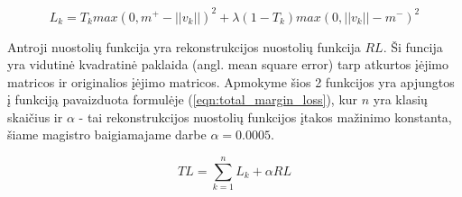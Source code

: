 \begin{equation}
\label{eqn:margin_loss}
	L_{k} = T_k max(0, m^+ - ||v_k||)^2 + \lambda (1 - T_k) max(0, ||v_k|| - m^-)^2
\end{equation}

Antroji nuostolių funkcija yra rekonstrukcijos nuostolių funkcija $RL$. Ši funcija yra vidutinė kvadratinė paklaida (angl. mean square error) tarp atkurtos įėjimo matricos ir originalios įėjimo matricos. Apmokyme šios 2 funkcijos yra apjungtos į funkciją pavaizduota formulėje (\ref{eqn:total_margin_loss}), kur $n$ yra klasių skaičius ir $\alpha$ - tai rekonstrukcijos nuostolių funkcijos įtakos mažinimo konstanta, šiame magistro baigiamajame darbe $\alpha = 0.0005$.

\begin{equation}
\label{eqn:total_margin_loss}
	TL = \sum_{k = 1}^{n} L_{k} + \alpha RL
\end{equation}

